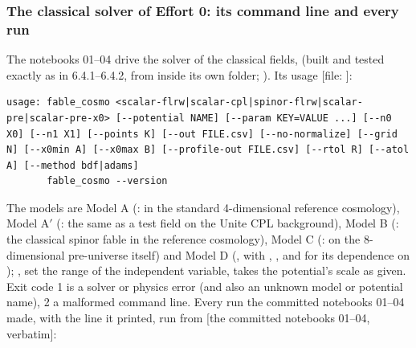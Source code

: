 \subsubsection{The classical solver \texorpdfstring{}{fable\_cosmo} of Effort 0: its command line and every run}
\label{sec:6.4.9}

The notebooks 01--04 drive the solver of the classical fields,  (built and tested exactly as in 6.4.1--6.4.2, from inside its own folder; ). Its usage [file: ]:

\begin{Verbatim}
usage: fable_cosmo <scalar-flrw|scalar-cpl|spinor-flrw|scalar-pre|scalar-pre-x0> [--potential NAME] [--param KEY=VALUE ...] [--n0 X0] [--n1 X1] [--points K] [--out FILE.csv] [--no-normalize] [--grid N] [--x0min A] [--x0max B] [--profile-out FILE.csv] [--rtol R] [--atol A] [--method bdf|adams]
       fable_cosmo --version
\end{Verbatim}

The models are Model A (:  in the standard 4-dimensional reference cosmology), Model A$'$ (: the same as a test field on the Unite CPL background), Model B (: the classical spinor fable in the reference cosmology), Model C (:  on the 8-dimensional pre-universe itself) and Model D (, with , ,  and  for its dependence on ); ,  set the range of the independent variable,  takes the potential's scale as given. Exit code 1 is a solver or physics error (and also an unknown model or potential name), 2 a malformed command line. Every run the committed notebooks 01--04 made, with the line it printed, run from  [the committed notebooks 01--04, verbatim]:

